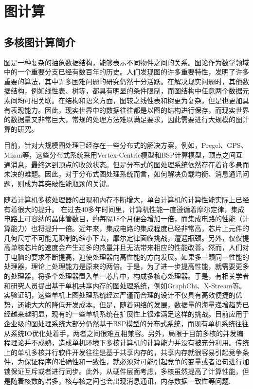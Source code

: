 
\chapter{图计算}

\section{多核图计算简介}

图是一种复杂的抽象数据结构，能够表示不同物件之间的关系。图论作为数学领域中的一个重要分支已经有数百年的历史。人们发现图的许多重要特性，发明了许多重要的算法，其中许多困难问题的研究仍然十分活跃。在解决现实问题时，其他数据结构，例如线性表、树等，都具有明显的条件限制，而图结构中任意两个数据元素间均可相关联。在结构和语义方面，图较之线性表和树更为复杂，但是也更加具有表现能力。因此，现实世界中的数据往往都是以图的结构进行保存，而现实世界的数据量又非常巨大，常规的处理方法难以满足要求，因此需要进行大规模的图计算的研究。

目前，针对大规模图处理已经存在一些分布式的解决方案，例如，Pregel、GPS、Mizan等，这些分布式系统采用Vertex-Centric模型和BSP计算模型，顶点之间互通消息，最终达到顶点的收敛状态。但是分布式的图处理系统依然存在着许多悬而未决的难题。因此，对于分布式图处理系统而言，如何解决负载均衡、消息通讯问题，则成为其突破性能瓶颈的关键。

随着计算机多核处理器的出现和内存不断增大，单台计算机的计算性能实际上已经有着很大的提升。
在过去40多年时间里，计算机性能一直遵循着摩尔定律，集成电路上可容纳的晶体管数目，约每隔18个月便会增加一倍，而集成电路的性能（计算能力）也将提升一倍。近年来，集成电路的集成程度已经非常高，芯片上元件的几何尺寸不可能无限制的缩小下去，摩尔定律面临挑战，遭遇瓶颈。另外，仅仅提高单核芯片的速度会产生过多的热量并且无法带来相应的性能改善。然而，人们对于电脑的要求不断提高，迫使处理器向高性能的方向发展。如果多一颗同一性能的处理器，理论上处理能力是原来的两倍。于是，为了进一步提高性能，就需要更多的处理器，将多个处理器置入单一芯片中，构成多核心处理器。于是，有相关学者和研究人员提出基于单机共享内存的图处理系统，例如GraphChi、X-Stream等。实验证明，这些单机上图处理系统经过严谨而合理的设计不仅具有高效便捷的优势，还能大大的降低开发成本。但是，随着网络的发展，数据量的海量递增趋势已经越来越明显，现有的一些单机系统在扩展性上很难满足这样的挑战。目前应用于企业级的图处理系统大部分仍然基于BSP模型的分布式系统，而现有单机系统往往从系统IO优化处着手，两者之间很难互相兼容。另外，局限于目前多核的并发编程理论并不成熟，造成单机环境下多核计算机的计算能力并没有被充分利用。传统上的单机多核并行软件开发往往是基于共享内存的，共享内存就很容易引起竞争条件，为保证程序的准确性和一致性，就必须对可能引起竞争的变量或者语句进行加锁保证互斥或者进行同步。此外，从硬件层面考虑，多核虽然提高了计算性能，但是随着核数的增多，核与核之间也会出现消息通讯，内存数据一致性等问题.

